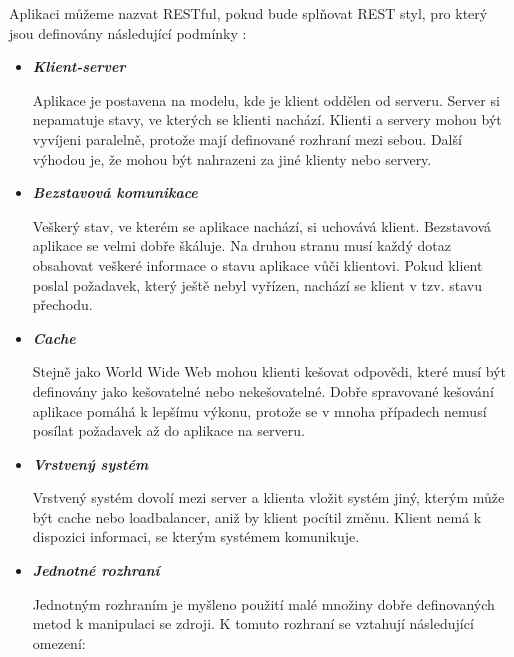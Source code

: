 \documentclass[11pt,twoside,a4paper]{book}
\begin{document}
Aplikaci můžeme nazvat RESTful, pokud bude splňovat REST styl, pro který jsou
definovány následující podmínky \cite{Burke14}:

\begin{itemize}
  \item \textbf{\textit{Klient-server}}

Aplikace je postavena na modelu, kde je klient oddělen od serveru. Server si
nepamatuje stavy, ve kterých se klienti nachází. Klienti a servery mohou být
vyvíjeni paralelně, protože mají definované rozhraní mezi sebou. Další výhodou
je, že mohou být nahrazeni za jiné klienty nebo servery.

\item \textbf{\textit{Bezstavová komunikace}}

Veškerý stav, ve kterém se aplikace nachází, si uchovává klient. Bezstavová
aplikace se velmi dobře škáluje. Na druhou stranu musí každý dotaz obsahovat veškeré informace o stavu
aplikace vůči klientovi. Pokud klient poslal požadavek, který ještě nebyl vyřízen, nachází se
klient v tzv. stavu přechodu.

\item \textbf{\textit{Cache}}

Stejně jako World Wide Web mohou klienti kešovat odpovědi, které musí být
definovány jako kešovatelné nebo nekešovatelné. Dobře spravované kešování aplikace
pomáhá k lepšímu výkonu, protože se v mnoha případech nemusí posílat požadavek až do
aplikace na serveru.

\item \textbf{\textit{Vrstvený systém}}

Vrstvený systém dovolí mezi server a klienta vložit systém jiný, kterým může být cache nebo
loadbalancer, aniž by klient pocítil změnu. Klient nemá k dispozici informaci, se kterým
systémem komunikuje.

\item \textbf{\textit{Jednotné rozhraní}}

Jednotným rozhraním je myšleno použití malé množiny dobře definovaných metod k
manipulaci se zdroji. K tomuto rozhraní se vztahují následující omezení:


\end{itemize}
\end{document}
